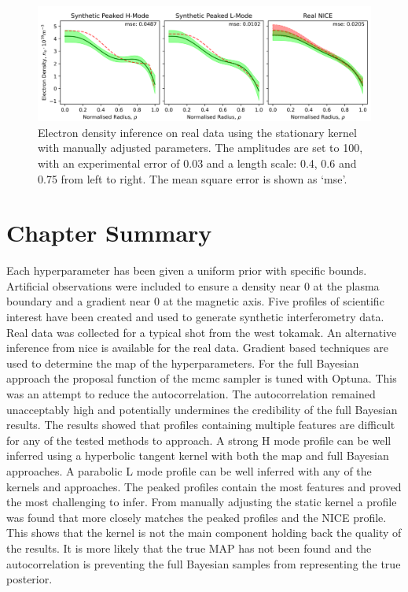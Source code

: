 \begin{figure}[H]
    \centering
    \includegraphics[width=\textwidth]{images/Final/manual.png}
    \caption{Electron density inference on real data using the stationary kernel with manually adjusted parameters. The amplitudes are set to 100, with an experimental error of 0.03 and a length scale: 0.4, 0.6 and 0.75 from left to right. The mean square error is shown as `mse'.}
    \label{fig:manual}
\end{figure}

\section{Chapter Summary}

Each hyperparameter has been given a uniform prior with specific bounds. Artificial observations were included to ensure a density near 0 at the plasma boundary and a gradient near 0 at the magnetic axis. Five profiles of scientific interest have been created and used to generate synthetic interferometry data. Real data was collected for a typical shot from the \gls{west} tokamak. An alternative inference from \gls{nice} is available for the real data. Gradient based techniques are used to determine the \gls{map} of the hyperparameters. For the full Bayesian approach the proposal function of the \gls{mcmc} sampler is tuned with Optuna. This was an attempt to reduce the autocorrelation. The autocorrelation remained unacceptably high and potentially undermines the credibility of the full Bayesian results. The results showed that profiles containing multiple features are difficult for any of the tested methods to approach. A strong H mode profile can be well inferred using a hyperbolic tangent kernel with both the \gls{map} and full Bayesian approaches. A parabolic L mode profile can be well inferred with any of the kernels and approaches. The peaked profiles contain the most features and proved the most challenging to infer. From manually adjusting the static kernel a profile was found that more closely matches the peaked profiles and the NICE profile. This shows that the kernel is not the main component holding back the quality of the results. It is more likely that the true MAP has not been found and the autocorrelation is preventing the full Bayesian samples from representing the true posterior.



